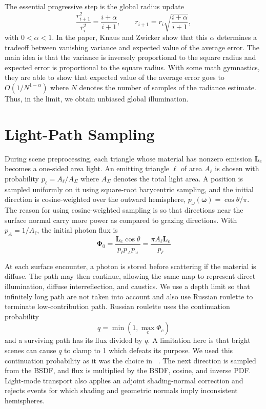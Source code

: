 \documentclass[10pt,twocolumn]{article}
\begin{document}
The essential progressive step is the global radius update
\begin{equation}
 \frac{r_{i+1}^2}{r_i^2}=\frac{i+\alpha}{i+1},
 \qquad
 r_{i+1}=r_i\sqrt{\frac{i+\alpha}{i+1}},
 \label{eq:radius}
\end{equation}
with $0<\alpha<1$. In the paper, Knaus and Zwicker show that this $\alpha$ determines a tradeoff between vanishing variance and expected value of the average error. The main idea is that the variance is inversely proportional to the square radius and expected error is proportional to the square radius. With some math gymnastics, they are able to show that expected value of the average error goes to $O(1/N^{1-\alpha})$ where $N$ denotes the number of samples of the radiance estimate. Thus, in the limit, we obtain unbiased global illumination. 

\section{Light-Path Sampling}

During scene preprocessing, each triangle whose material has nonzero emission
$\mathbf L_e$ becomes a one-sided area light.  An emitting triangle $\ell$ of
area $A_\ell$ is chosen with probability $p_\ell=A_\ell/A_\Sigma$ where $A_\Sigma$ denotes the total light area.  A position
is sampled uniformly on it using square-root barycentric sampling, and the
initial direction is cosine-weighted over the outward hemisphere,
$p_\omega(\boldsymbol\omega)=\cos\theta/\pi$. The reason for using cosine-weighted sampling is so that directions near the surface normal carry more power as compared to grazing directions.  With
$p_A=1/A_\ell$, the initial photon flux is
\begin{equation}
 \boldsymbol\Phi_0=
 \frac{\mathbf L_e\cos\theta}{p_\ell p_A p_\omega}
 =\frac{\pi A_\ell\mathbf L_e}{p_\ell}
 \label{eq:emission}
\end{equation}

At each surface encounter, a photon is stored before scattering if the material
is diffuse.  The path may then continue, allowing the same map to represent
direct illumination, diffuse interreflection, and caustics. We use a depth limit so that infinitely long path are not taken into account and also use Russian roulette to terminate low-contribution path. Russian roulette
uses the continuation probability
\begin{equation}
 q=\min\!\left(1,\max_c \Phi_c\right)
\end{equation}
and a surviving path has its flux divided by $q$. A limitation here is that bright scenes can cause $q$ to clamp to 1 which defeats its purpose. We used this continuation probability as it was the choice in ~\cite{pbrt}.  The next direction is sampled
from the BSDF, and flux is multiplied by the BSDF, cosine, and inverse PDF.
Light-mode transport also applies an adjoint shading-normal correction and
rejects events for which shading and geometric normals imply inconsistent
hemispheres.
\end{document}
